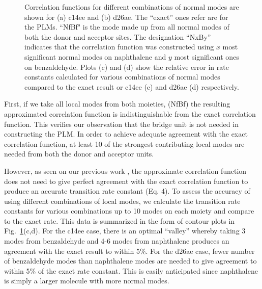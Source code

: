 \begin{figure}[!h]
\caption{Correlation functions for different combinations of normal modes are shown for (a) c14ee and (b) d26ae.  The ``exact'' ones refer are for the PLMs.  ``NfBf"
is the mode made up from all normal modes of both the donor and acceptor sites.
The designation ``NxBy'' indicates that the correlation function was constructed using  $x$ most significant normal modes
on naphthalene and $y$ most significant ones on benzaldehyde.   Plots (c) and (d) show the
 relative error in rate constants calculated for various combinations of normal modes compared to the exact result
 or c14ee (c) and d26ae (d) respectively. \label{backCorr}}
\end{figure}


 First, if we take all local modes from both moieties, (NfBf)
 the resulting approximated correlation function is indistinguishable from the exact correlation function.
This verifies our observation that the bridge unit is not needed in constructing the
PLM.
In order to achieve adequate agreement with the exact correlation function,
at least 10 of the strongest contributing local modes are needed from both the donor and acceptor units.

However, as seen on our previous work \cite{yang2014intramolecular},
the approximate correlation function does not need to give perfect agreement
with the exact correlation function to produce an accurate transition rate constant (Eq. 4).
To assess the accuracy of using different combinations of local modes,
we calculate the transition rate constants for various combinations up to 10 modes on
each moiety and compare to the exact rate.
This data is summarized in the form of contour plots in  Fig.~\ref{backCorr}(c,d).
For the c14ee case, there is an optimal ``valley'' whereby taking 3 modes from benzaldehyde and 4-6 modes from
naphthalene produces an agreement with the exact result to within 5\%.
For the d26ae case,  fewer number of benzaldehyde modes than naphthalene modes are needed to
give agreement to within 5\% of the exact rate constant.   This is easily anticipated since
naphthalene is simply a larger molecule with more normal modes.


